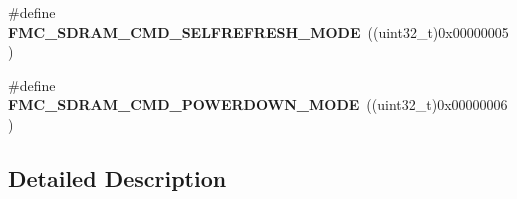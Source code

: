 \begin{DoxyCompactItemize}
\item 
\#define {\bfseries F\+M\+C\+\_\+\+S\+D\+R\+A\+M\+\_\+\+C\+M\+D\+\_\+\+S\+E\+L\+F\+R\+E\+F\+R\+E\+S\+H\+\_\+\+M\+O\+DE}~((uint32\+\_\+t)0x00000005)\hypertarget{group___f_m_c___s_d_r_a_m___command___mode_ga52f01a3065f042e64ab20b2162a78f69}{}\label{group___f_m_c___s_d_r_a_m___command___mode_ga52f01a3065f042e64ab20b2162a78f69}

\item 
\#define {\bfseries F\+M\+C\+\_\+\+S\+D\+R\+A\+M\+\_\+\+C\+M\+D\+\_\+\+P\+O\+W\+E\+R\+D\+O\+W\+N\+\_\+\+M\+O\+DE}~((uint32\+\_\+t)0x00000006)\hypertarget{group___f_m_c___s_d_r_a_m___command___mode_gaded954e404bf8d89b5a3ee6b76664101}{}\label{group___f_m_c___s_d_r_a_m___command___mode_gaded954e404bf8d89b5a3ee6b76664101}

\end{DoxyCompactItemize}


\subsection{Detailed Description}
